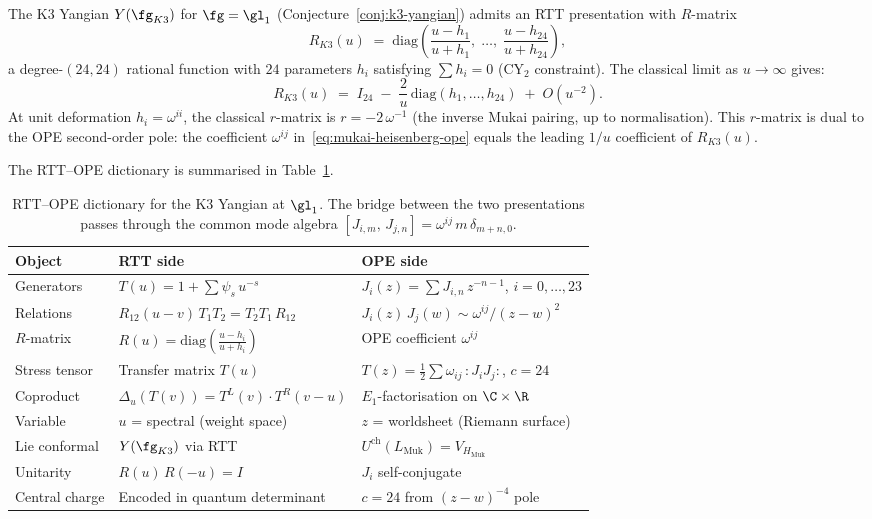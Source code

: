 \begin{conjecture}
\label{conj:rtt-ope-dictionary}
\ClaimStatusConjectured
The K3 Yangian $Y(\fg_{K3})$ for $\fg = \gl_1$ (Conjecture~\ref{conj:k3-yangian}) admits an RTT presentation with $R$-matrix
\begin{equation}\label{eq:rk3-diagonal}
 R_{K3}(u) \;=\; \mathrm{diag}\!\left(\frac{u - h_1}{u + h_1},\; \ldots,\; \frac{u - h_{24}}{u + h_{24}}\right),
\end{equation}
a degree-$(24,24)$ rational function with $24$ parameters $h_i$ satisfying $\sum h_i = 0$ (CY$_2$ constraint). The classical limit as $u \to \infty$ gives:
\begin{equation}\label{eq:classical-r-mukai}
 R_{K3}(u) \;=\; I_{24} \;-\; \frac{2}{u}\, \mathrm{diag}(h_1, \ldots, h_{24}) \;+\; O(u^{-2}).
\end{equation}
At unit deformation $h_i = \omega^{ii}$, the classical $r$-matrix is $r = -2\, \omega^{-1}$ (the inverse Mukai pairing, up to normalisation). This $r$-matrix is dual to the OPE second-order pole: the coefficient $\omega^{ij}$ in~\eqref{eq:mukai-heisenberg-ope} equals the leading $1/u$ coefficient of $R_{K3}(u)$.
\end{conjecture}

The RTT--OPE dictionary is summarised in Table~\ref{tab:rtt-ope}.

\begin{table}[ht]
\centering
\small
\renewcommand{\arraystretch}{1.3}
\begin{tabular}{lll}
\toprule
\textbf{Object} & \textbf{RTT side} & \textbf{OPE side} \\
\midrule
Generators & $T(u) = 1 + \sum \psi_s\, u^{-s}$ & $J_i(z) = \sum J_{i,n}\, z^{-n-1}$, $i=0,\ldots,23$ \\
Relations & $R_{12}(u{-}v)\, T_1 T_2 = T_2 T_1\, R_{12}$ & $J_i(z)\, J_j(w) \sim \omega^{ij}/(z{-}w)^2$ \\
$R$-matrix & $R(u) = \mathrm{diag}(\frac{u-h_i}{u+h_i})$ & OPE coefficient $\omega^{ij}$ \\
Stress tensor & Transfer matrix $T(u)$ & $T(z) = \tfrac{1}{2}\sum \omega_{ij}\,{:}J_i J_j{:}$, $c = 24$ \\
Coproduct & $\Delta_u(T(v)) = T^L(v) \cdot T^R(v{-}u)$ & $E_1$-factorisation on $\C \times \R$ \\
Variable & $u$ = spectral (weight space) & $z$ = worldsheet (Riemann surface) \\
Lie conformal & $Y(\fg_{K3})$ via RTT & $U^{\mathrm{ch}}(L_{\mathrm{Muk}}) = V_{H_{\mathrm{Muk}}}$ \\
Unitarity & $R(u)\, R(-u) = I$ & $J_i$ self-conjugate \\
Central charge & Encoded in quantum determinant & $c = 24$ from $(z{-}w)^{-4}$ pole \\
\bottomrule
\end{tabular}
\caption{RTT--OPE dictionary for the K3 Yangian at $\gl_1$. The bridge between the two presentations passes through the common mode algebra $[J_{i,m},\, J_{j,n}] = \omega^{ij}\, m\, \delta_{m+n,0}$.}
\label{tab:rtt-ope}
\end{table}

